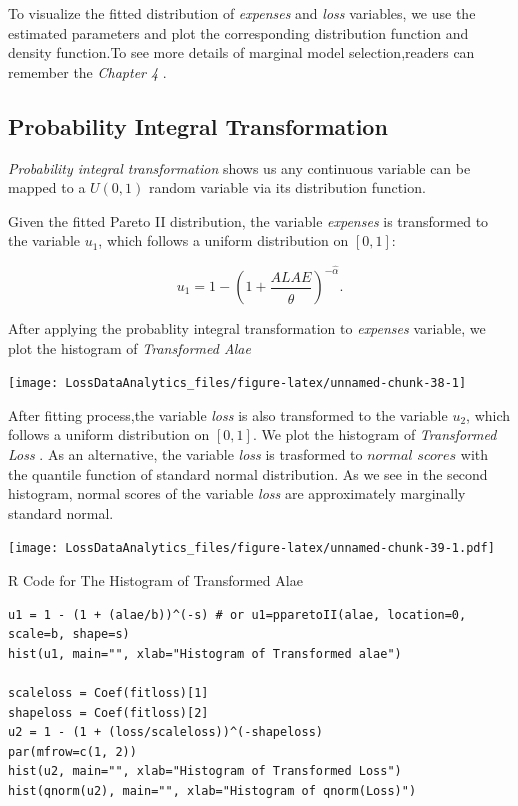 \documentclass[]{book}
\theoremstyle{definition}
\theoremstyle{definition}
\theoremstyle{definition}
\theoremstyle{remark}
\begin{document}
To visualize the fitted distribution of \emph{expenses } and \emph{loss}
variables, we use the estimated parameters and plot the corresponding
distribution function and density function.To see more details of
marginal model selection,readers can remember the \emph{Chapter 4 }.

\subsection{Probability Integral
Transformation}\label{probability-integral-transformation}

\emph{Probability integral transformation } shows us any continuous
variable can be mapped to a \(U(0,1)\) random variable via its
distribution function.

Given the fitted Pareto II distribution, the variable \emph{expenses} is
transformed to the variable \(u_1\), which follows a uniform
distribution on \([0,1]\):

\[u_1 = 1 - \left( 1 + \frac{ALAE}{\hat{\theta}} \right)^{-\hat{\alpha}}.\]

After applying the probablity integral transformation to \emph{expenses
} variable, we plot the histogram of \emph{Transformed Alae }

\begin{center}\texttt{[image: LossDataAnalytics\_files/figure-latex/unnamed-chunk-38-1]} \end{center}

After fitting process,the variable \emph{loss} is also transformed to
the variable \(u_2\), which follows a uniform distribution on \([0,1]\).
We plot the histogram of \emph{Transformed Loss }. As an alternative,
the variable \emph{loss} is trasformed to \(normal\) \(scores\) with the
quantile function of standard normal distribution. As we see in the
second histogram, normal scores of the variable \emph{loss} are
approximately marginally standard normal.

\texttt{[image: LossDataAnalytics\_files/figure-latex/unnamed-chunk-39-1.pdf]}

R Code for The Histogram of Transformed Alae

\hypertarget{display.transalae.2}{}
\begin{verbatim}
u1 = 1 - (1 + (alae/b))^(-s) # or u1=pparetoII(alae, location=0, scale=b, shape=s)
hist(u1, main="", xlab="Histogram of Transformed alae")

scaleloss = Coef(fitloss)[1]
shapeloss = Coef(fitloss)[2]
u2 = 1 - (1 + (loss/scaleloss))^(-shapeloss)
par(mfrow=c(1, 2))
hist(u2, main="", xlab="Histogram of Transformed Loss")
hist(qnorm(u2), main="", xlab="Histogram of qnorm(Loss)")
\end{verbatim}
\end{document}
